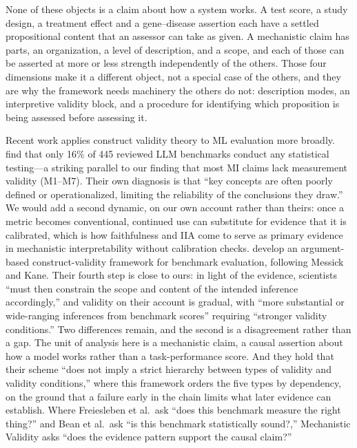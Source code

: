 \documentclass{article}
\begin{document}
None of these objects is a claim about how a system works. A test score, a study design, a treatment effect and a gene--disease assertion each have a settled propositional content that an assessor can take as given. A mechanistic claim has parts, an organization, a level of description, and a scope, and each of those can be asserted at more or less strength independently of the others. Those four dimensions make it a different object, not a special case of the others, and they are why the framework needs machinery the others do not: description modes, an interpretive validity block, and a procedure for identifying which proposition is being assessed before assessing it.

Recent work applies construct validity theory to ML evaluation more broadly. \citet{bean2025measuring} find that only 16\% of 445 reviewed LLM benchmarks conduct any statistical testing---a striking parallel to our finding that most MI claims lack measurement validity (M1--M7). Their own diagnosis is that ``key concepts are often poorly defined or operationalized, limiting the reliability of the conclusions they draw.'' We would add a second dynamic, on our own account rather than theirs: once a metric becomes conventional, continued use can substitute for evidence that it is calibrated, which is how faithfulness and IIA come to serve as primary evidence in mechanistic interpretability without calibration checks. \citet{freiesleben2025benchmarking} develop an argument-based construct-validity framework for benchmark evaluation, following Messick and Kane. Their fourth step is close to ours: in light of the evidence, scientists ``must then constrain the scope and content of the intended inference accordingly,'' and validity on their account is gradual, with ``more substantial or wide-ranging inferences from benchmark scores'' requiring ``stronger validity conditions.'' Two differences remain, and the second is a disagreement rather than a gap. The unit of analysis here is a mechanistic claim, a causal assertion about how a model works rather than a task-performance score. And they hold that their scheme ``does not imply a strict hierarchy between types of validity and validity conditions,'' where this framework orders the five types by dependency, on the ground that a failure early in the chain limits what later evidence can establish. Where Freiesleben et al.\ ask ``does this benchmark measure the right thing?'' and Bean et al.\ ask ``is this benchmark statistically sound?,'' Mechanistic Validity asks ``does the evidence pattern support the causal claim?''
\end{document}
